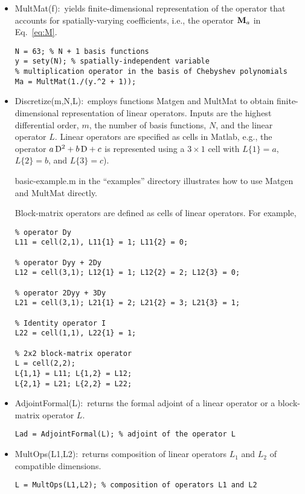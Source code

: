 \documentclass[%
secnumarabic,%
 amssymb, amsmath,%
 aps,prf,superscriptaddress,longbibliography
frontmatterverbose,
]{revtex4-2}
\begin{document}
\begin{itemize}
   \item \textsf{MultMat(f)}:~yields finite-dimensional representation of the operator that accounts for spatially-varying coefficients, i.e., the operator $\mathbf{M}_a$ in Eq.~\eqref{eq:M}.
\begin{lstlisting}
N = 63; % N + 1 basis functions
y = sety(N); % spatially-independent variable
% multiplication operator in the basis of Chebyshev polynomials
Ma = MultMat(1./(y.^2 + 1));
\end{lstlisting}

  \item \textsf{Discretize(m,N,L)}:~employs functions \textsf{Matgen} and \textsf{MultMat} to obtain finite-dimensional representation of linear operators. Inputs are the highest differential order, $m$, the number of basis functions, $N$, and the linear operator $L$. Linear operators are specified as cells in Matlab, e.g., the operator $a\,\mathrm D^2 + b\,\mathrm D + c$ is represented using a $3\times 1$ cell with $L\{1\} = a$, $L\{2\} = b$, and $L\{3\} = c$). 
  
	\vspace*{0.1cm}  
{\sf basic-example.m} in the ``examples'' directory illustrates how to use \textsf{Matgen} and \textsf{MultMat} directly.
 
 	\vspace*{0.1cm}  
Block-matrix operators are defined as cells of linear operators. For example, 
\begin{lstlisting}
% operator Dy
L11 = cell(2,1), L11{1} = 1; L11{2} = 0;

% operator Dyy + 2Dy
L12 = cell(3,1); L12{1} = 1; L12{2} = 2; L12{3} = 0;

% operator 2Dyy + 3Dy
L21 = cell(3,1); L21{1} = 2; L21{2} = 3; L21{3} = 1;

% Identity operator I
L22 = cell(1,1), L22{1} = 1;

% 2x2 block-matrix operator
L = cell(2,2);
L{1,1} = L11; L{1,2} = L12;
L{2,1} = L21; L{2,2} = L22;
\end{lstlisting}
  
\item {\sf AdjointFormal(L):}~returns the formal adjoint of a linear operator or a block-matrix operator $L$.
\begin{lstlisting}
Lad = AdjointFormal(L); % adjoint of the operator L
\end{lstlisting}
  
\item {\sf MultOps(L1,L2):}~returns composition of linear operators $L_1$ and $L_2$ of compatible dimensions.
\begin{lstlisting}
L = MultOps(L1,L2); % composition of operators L1 and L2
\end{lstlisting}


\end{itemize}
\end{document}
